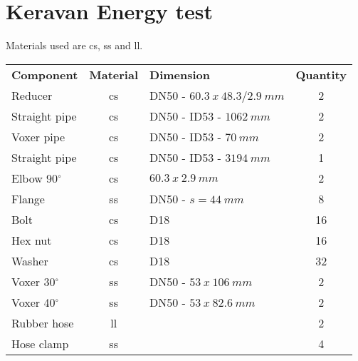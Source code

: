 \section{Keravan Energy test}
Materials used are \gls{cs}, \gls{ss} and \gls{ll}.
\begin{table}[h!]
\centering
\begin{tabular}{lclc}
\textbf{Component} & \textbf{Material} & \textbf{Dimension}        & \textbf{Quantity} \\
Reducer            & \gls{cs}                & DN50 - $60.3\ x\ 48.3/2.9\ mm$ & 2                 \\
Straight pipe      & \gls{cs}               & DN50 - ID53 - $1062\ mm$     & 2                 \\
Voxer pipe         & \gls{cs}                & DN50 - ID53 - $70\ mm$       & 2                 \\
Straight pipe      & \gls{cs}              & DN50 - ID53 - $3194\ mm$     & 1                 \\
Elbow 90$^{\circ}$           & \gls{cs}               & $60.3\ x\ 2.9\ mm$             & 2                 \\
Flange             & \gls{ss}               & DN50 - $s = 44\ mm$          & 8                 \\
Bolt               & \gls{cs}                & D18                       & 16                \\
Hex nut            & \gls{cs}               & D18                       & 16                \\
Washer             & \gls{cs}               & D18                       & 32                \\
Voxer 30$^{\circ}$           & \gls{ss}                & DN50 - $53\ x\ 106\ mm$    & 2                 \\
Voxer 40$^{\circ}$           & \gls{ss}               & DN50 - $53\ x\ 82.6\ mm$      & 2                 \\
Rubber hose        &  \gls{ll}             &                           & 2                 \\
Hose clamp         & \gls{ss}                &                           & 4                
\end{tabular}
\end{table}


\clearpage